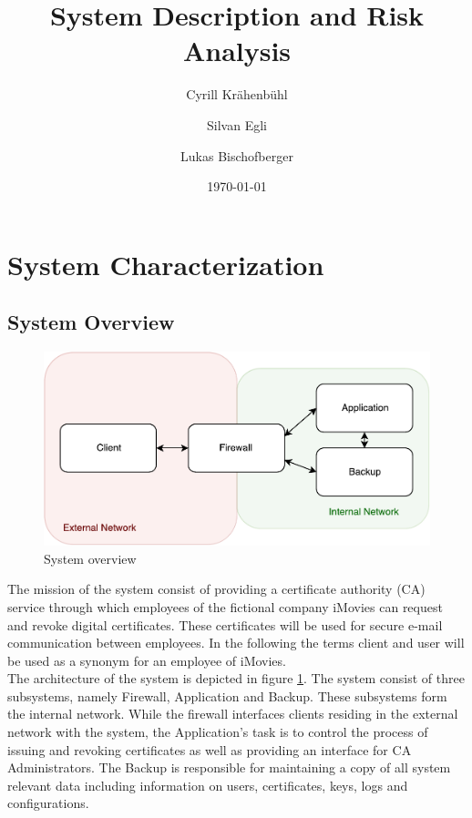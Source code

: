\documentclass[english]{article}
\title{\huge\sffamily\bfseries System Description and Risk Analysis}
\author{Cyrill Krähenbühl \and Silvan Egli \and Lukas Bischofberger}
\date{\today}
\begin{document}
\maketitle


\tableofcontents
\pagebreak


\section{System Characterization}

\subsection{System Overview}


\begin{figure}[ht]
	\centering
	\includegraphics[scale=0.5]{src/systemoverview.pdf}
	\caption{System overview}
	\label{figure:systemoverview}
\end{figure}

The mission of the system consist of providing a certificate authority (CA) service through which employees of the fictional company iMovies can request and revoke digital certificates. These certificates will be used for secure e-mail communication between employees.
In the following the terms client and user will be used as a synonym for an employee of iMovies.\\
The architecture of the system is depicted in figure {\ref{figure:systemoverview}}.
The system consist of three subsystems, namely Firewall, Application and Backup. These subsystems form the internal network. While the firewall interfaces clients residing in the external network with the system, the Application's task is to control the process of issuing and revoking certificates as well as providing an interface for CA Administrators. The Backup is responsible for maintaining a copy of all system relevant data including information on users, certificates, keys, logs and configurations.
\end{document}
